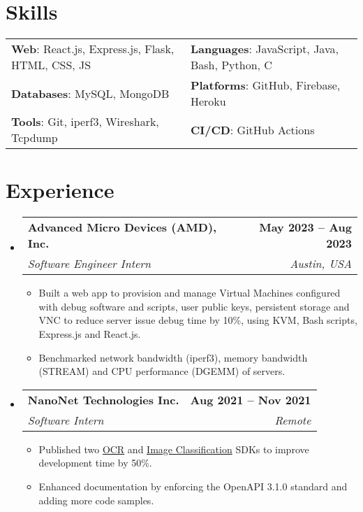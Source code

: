 \documentclass[letterpaper,11pt]{article}
\makeatletter
\newcommand{\resumeItem}[1]{
  \item\small{
    {#1 \vspace{-2pt}}
  }
}
\newcommand{\resumeSubheading}[4]{
  \vspace{-2pt}\item
    \begin{tabular*}{1.0\textwidth}[t]{l@{\extracolsep{\fill}}r}
      \vspace{-2pt}\textbf{#1} & \textbf{\small #2} \\
      \textit{\small#3} & \textit{\small #4} \\
    \end{tabular*}\vspace{-7pt}
}
\newcommand{\resumeSubHeadingListStart}{\begin{itemize}[leftmargin=0.0in, label={}]}
\newcommand{\resumeSubHeadingListEnd}{\end{itemize}}
\newcommand{\resumeItemListStart}{\begin{itemize}}
\newcommand{\resumeItemListEnd}{\end{itemize}\vspace{-5pt}}
\makeatother
\begin{document}
\section{Skills}
    \vspace{-2pt}
    \begin{itemize}[leftmargin=0.2in, label={}]
        {\item{
            \begin{tabular}{ l@{\hskip 0.2in} l }
                 \textbf{Web}: React.js, Express.js, Flask, HTML, CSS, JS & \textbf{Languages}: JavaScript, Java, Bash, Python, C \\ 
                 \textbf{Databases}: MySQL, MongoDB & \textbf{Platforms}: GitHub, Firebase, Heroku \\  
                 \textbf{Tools}: Git, iperf3, Wireshark, Tcpdump & \textbf{CI/CD}: GitHub Actions
            \end{tabular}
        }}
    \end{itemize}
\vspace{-20pt}


\section{Experience}
    \resumeSubHeadingListStart
        \resumeSubheading
            {Advanced Micro Devices (AMD), Inc.}{May 2023 -- Aug 2023}
            {Software Engineer Intern}{Austin, USA}
            \resumeItemListStart
                \resumeItem{Built a web app to provision and manage Virtual Machines configured with debug software and scripts, user public keys, persistent storage and VNC to reduce server issue debug time by 10\%, using KVM, Bash scripts, Express.js and React.js.}
                \resumeItem{Benchmarked network bandwidth (iperf3), memory bandwidth (STREAM) and CPU performance (DGEMM) of servers.}
            \resumeItemListEnd

        \resumeSubheading
            {NanoNet Technologies Inc.}{Aug 2021 -- Nov 2021}
            {Software Intern}{Remote}
            \resumeItemListStart
                \resumeItem{Published two \href{https://www.npmjs.com/package/@nanonets/optical-character-recognition}{OCR} and \href{https://www.npmjs.com/package/@nanonets/image-classification}{Image Classification} SDKs to improve development time by 50\%.}
                \resumeItem{Enhanced documentation by enforcing the OpenAPI 3.1.0 standard and adding more code samples.}
            \resumeItemListEnd
    \resumeSubHeadingListEnd
\vspace{-15pt}
\end{document}
